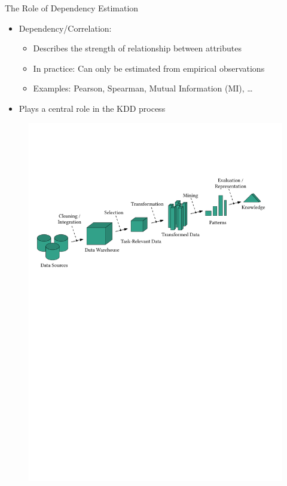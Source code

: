 \documentclass[16pt,usenames,dvipsnames, notheorems]{beamer}
\theoremstyle{definition}
\theoremstyle{example}
\theoremstyle{plain}
\begin{document}
\begin{frame}{The Role of Dependency Estimation}
\begin{itemize}
	\item Dependency/Correlation:
	\begin{itemize}
		\item Describes the strength of relationship between attributes
		\item In practice: Can only be \textcolor{uiucred}{estimated} from empirical observations
		\item Examples: Pearson, Spearman, Mutual Information (MI), \dots
	\end{itemize}
	\pause
	\item Plays a central role in the KDD process
\end{itemize}
\vspace{-1.0cm}
\begin{figure}
	\begin{overprint}
		 \includegraphics[width=0.98\linewidth]{figures/kdd_5-compressed.pdf}

\end{overprint}
\end{figure}
\end{frame}
\end{document}
